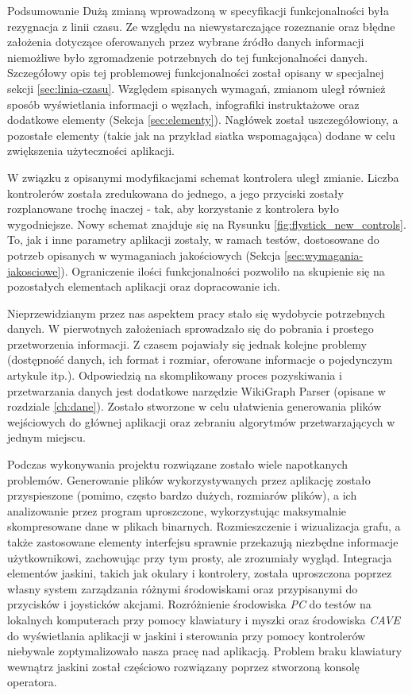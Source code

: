 \begin{chapter}{Podsumowanie}
	Dużą zmianą wprowadzoną w specyfikacji funkcjonalności była rezygnacja z linii czasu. Ze względu na niewystarczające rozeznanie oraz błędne założenia dotyczące oferowanych przez wybrane źródło danych informacji niemożliwe było zgromadzenie potrzebnych do tej funkcjonalności danych. Szczegółowy opis tej problemowej funkcjonalności został opisany w specjalnej sekcji \ref{sec:linia-czasu}. Względem spisanych wymagań, zmianom uległ również sposób wyświetlania informacji o węzłach, infografiki instruktażowe oraz dodatkowe elementy (Sekcja \ref{sec:elementy}). Nagłówek został uszczegółowiony, a pozostałe elementy (takie jak na przykład siatka wspomagająca) dodane w celu zwiększenia użyteczności aplikacji.

	W związku z opisanymi modyfikacjami schemat kontrolera uległ zmianie. Liczba kontrolerów została zredukowana do jednego, a jego przyciski zostały rozplanowane trochę inaczej - tak, aby korzystanie z kontrolera było wygodniejsze. Nowy schemat znajduje się na Rysunku \ref{fig:flystick_new_controls}. To, jak i inne parametry aplikacji zostały, w ramach testów, dostosowane do potrzeb opisanych w wymaganiach jakościowych (Sekcja \ref{sec:wymagania-jakosciowe}). Ograniczenie ilości funkcjonalności pozwoliło na skupienie się na pozostałych elementach aplikacji oraz dopracowanie ich.

	Nieprzewidzianym przez nas aspektem pracy stało się wydobycie potrzebnych danych. W pierwotnych założeniach sprowadzało się do pobrania i prostego przetworzenia informacji. Z czasem pojawiały się jednak kolejne problemy (dostępność danych, ich format i rozmiar, oferowane informacje o pojedynczym artykule itp.). Odpowiedzią na skomplikowany proces pozyskiwania i przetwarzania danych jest dodatkowe narzędzie WikiGraph Parser (opisane w rozdziale \ref{ch:dane}). Zostało stworzone w celu ułatwienia generowania plików wejściowych do głównej aplikacji oraz zebraniu algorytmów przetwarzających w jednym miejscu.

	Podczas wykonywania projektu rozwiązane zostało wiele napotkanych problemów. Generowanie plików wykorzystywanych przez aplikację zostało przyspieszone (pomimo, często bardzo dużych, rozmiarów plików), a ich analizowanie przez program uproszczone, wykorzystując maksymalnie skompresowane dane w plikach binarnych. Rozmieszczenie i wizualizacja grafu, a także zastosowane elementy interfejsu sprawnie przekazują niezbędne informacje użytkownikowi, zachowując przy tym prosty, ale zrozumiały wygląd. Integracja elementów jaskini, takich jak okulary i kontrolery, została uproszczona poprzez własny system zarządzania różnymi środowiskami oraz przypisanymi do przycisków i joysticków akcjami. Rozróżnienie środowiska \textit{PC} do testów na lokalnych komputerach przy pomocy klawiatury i myszki oraz środowiska \textit{CAVE} do wyświetlania aplikacji w jaskini i sterowania przy pomocy kontrolerów niebywale zoptymalizowało nasza pracę nad aplikacją. Problem braku klawiatury wewnątrz jaskini został częściowo rozwiązany poprzez stworzoną konsolę operatora.


\end{chapter}
